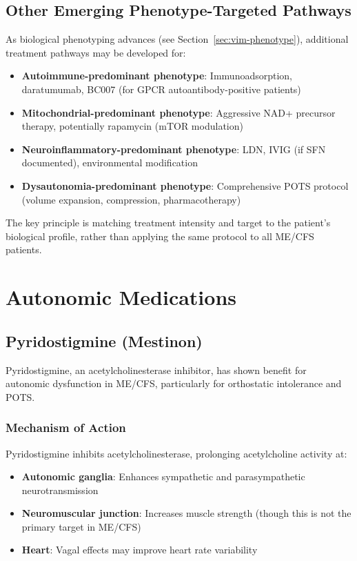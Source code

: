 \subsection{Other Emerging Phenotype-Targeted Pathways}

As biological phenotyping advances (see Section~\ref{sec:vim-phenotype}), additional treatment pathways may be developed for:
\begin{itemize}
    \item \textbf{Autoimmune-predominant phenotype}: Immunoadsorption, daratumumab, BC007 (for GPCR autoantibody-positive patients)
    \item \textbf{Mitochondrial-predominant phenotype}: Aggressive NAD+ precursor therapy, potentially rapamycin (mTOR modulation)
    \item \textbf{Neuroinflammatory-predominant phenotype}: LDN, IVIG (if SFN documented), environmental modification
    \item \textbf{Dysautonomia-predominant phenotype}: Comprehensive POTS protocol (volume expansion, compression, pharmacotherapy)
\end{itemize}

The key principle is matching treatment intensity and target to the patient's biological profile, rather than applying the same protocol to all ME/CFS patients.

\section{Autonomic Medications}
\label{sec:autonomic-medications}

\subsection{Pyridostigmine (Mestinon)}
\label{sec:pyridostigmine}

Pyridostigmine, an acetylcholinesterase inhibitor, has shown benefit for autonomic dysfunction in ME/CFS, particularly for orthostatic intolerance and POTS.

\subsubsection{Mechanism of Action}

Pyridostigmine inhibits acetylcholinesterase, prolonging acetylcholine activity at:
\begin{itemize}
    \item \textbf{Autonomic ganglia}: Enhances sympathetic and parasympathetic neurotransmission
    \item \textbf{Neuromuscular junction}: Increases muscle strength (though this is not the primary target in ME/CFS)
    \item \textbf{Heart}: Vagal effects may improve heart rate variability
\end{itemize}

